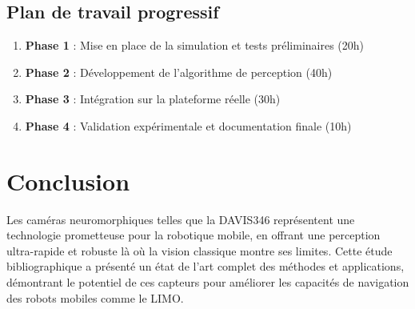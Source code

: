 \subsection{Plan de travail progressif}
\begin{enumerate}
\item \textbf{Phase 1} : Mise en place de la simulation et tests préliminaires (20h)
\item \textbf{Phase 2} : Développement de l'algorithme de perception (40h)
\item \textbf{Phase 3} : Intégration sur la plateforme réelle (30h)
\item \textbf{Phase 4} : Validation expérimentale et documentation finale (10h)
\end{enumerate}

\section*{Conclusion}
Les caméras neuromorphiques telles que la DAVIS346 représentent une technologie prometteuse pour la robotique mobile, en offrant une perception ultra-rapide et robuste là où la vision classique montre ses limites. Cette étude bibliographique a présenté un état de l'art complet des méthodes et applications, démontrant le potentiel de ces capteurs pour améliorer les capacités de navigation des robots mobiles comme le LIMO.

